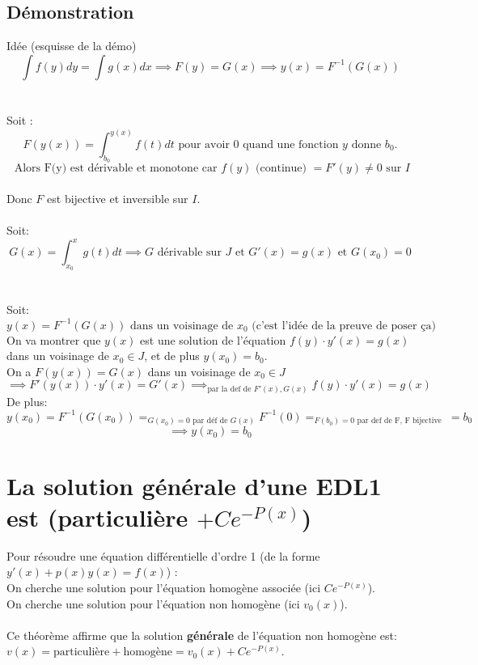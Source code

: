 \documentclass{article}
\begin{document}
\subsection{Démonstration}

Idée (esquisse de la démo)
\[ \int{f(y)dy}= \int{g(x)dx} \implies F(y) = G(x) \implies y(x) = F^{-1}(G(x)) \]\\\\
Soit :
\[ F(y(x)) = \int_{b_0}^{y(x)} f(t)dt \text{ pour avoir } 0 \text{ quand une fonction } y \text{ donne } b_0.\]
\[ \text{ Alors F(y) est dérivable et monotone car } f(y) \text{ (continue) } = F'(y) \neq 0 \text{ sur } I \]
\\
Donc $ F $ est bijective et inversible sur $ I $.\\\\
Soit:
\[ G(x) = \int_{x_0}^{x}g(t)dt \implies G \text{ dérivable sur } J \text{ et } G'(x) = g(x) \text{ et } G(x_0) = 0 \]\\\\
Soit:
\[ y(x) = F^{-1}(G(x)) \text{ dans un voisinage de } x_0 \text{ (c'est l'idée de la preuve de poser ça)} \]
On va montrer que $ y(x) $ est une solution de l'équation $ f(y) \cdot y'(x) = g(x) $ dans un voisinage de $ x_0 \in J $, et de plus $ y(x_0) = b_0 $.\\
On a $ F(y(x)) = G(x) $ dans un voisinage de $ x_0 \in J $\\
\[ \implies F'(y(x)) \cdot y'(x) = G'(x) \implies_{\text{par la def de } F'(x), G(x)} f(y) \cdot y'(x) = g(x) \]
De plus:
\[ y(x_0) = F^{-1}(G(x_0)) =_{G(x_0) = 0 \text{ par déf de } G(x)} F^{-1}(0) =_{F(b_0) = 0 \text{ par def de F, F bijective }} = b_0\]
\[ \implies y(x_0) = b_0 \]

\newpage

\section{La solution générale d'une EDL1 est (particulière $ + Ce^{-P(x)} $)}

Pour résoudre une équation différentielle d'ordre 1 (de la forme $ y'(x) + p(x)y(x) = f(x) $) :\\
On cherche une solution pour l'équation homogène associée (ici $ Ce^{-P(x)}$).\\
On cherche une solution pour l'équation non homogène (ici $ v_0(x) $).\\\\
Ce théorème affirme que la solution \textbf{générale} de l'équation non homogène est:\\
$ v(x) = \text{particulière} + \text{homogène} = v_0(x) + Ce^{-P(x)}$.
\end{document}
